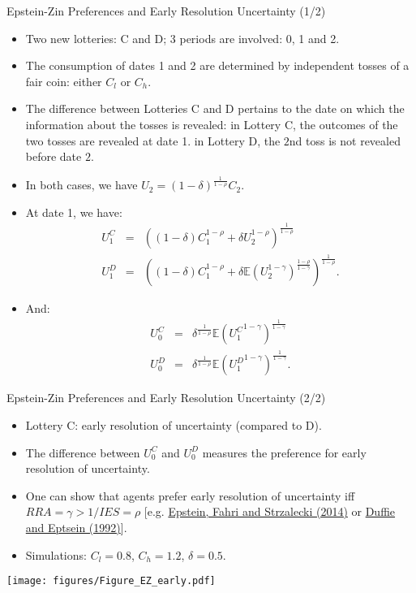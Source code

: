 \begin{frame}{Epstein-Zin Preferences and Early Resolution Uncertainty (1/2)}
\begin{scriptsize}
\begin{itemize}
	\item Two new lotteries: C and D; 3 periods are involved: 0, 1 and 2.
	\item The consumption of dates 1 and 2 are determined by independent tosses of a fair coin: either $C_l$ or $C_h$.
	\item The difference between Lotteries C and D pertains to the date on which the information about the tosses is revealed: in Lottery C, the outcomes of the two tosses are revealed at date 1. in Lottery D, the $2$nd toss is not revealed before date $2$.
	\item In both cases, we have $U_2 = (1-\delta)^{\frac{1}{1-\rho}}C_{2}$.
	\item At date 1, we have:
	\begin{eqnarray*}
	U_1^C &=& \left((1-\delta)C_1^{1-\rho} + \delta U_2^{1-\rho}\right)^{\frac{1}{1-\rho}}\\
	U_1^D &=& \left((1-\delta)C_1^{1-\rho} + \delta \mathbb{E}(U_2^{1-\gamma})^{\frac{1-\rho}{1-\gamma}}\right)^{\frac{1}{1-\rho}}.
	\end{eqnarray*}
	\item And:	
	\begin{eqnarray*}
	U_0^C &=& \delta^{\frac{1}{1-\rho}} \mathbb{E}({U_1^C}^{1-\gamma})^{\frac{1}{1-\gamma}}\\
	U_0^D &=& \delta^{\frac{1}{1-\rho}} \mathbb{E}({U_1^D}^{1-\gamma})^{\frac{1}{1-\gamma}}.
	\end{eqnarray*}
\end{itemize}
\end{scriptsize}
\end{frame}



\begin{frame}{Epstein-Zin Preferences and Early Resolution Uncertainty (2/2)}
\begin{scriptsize}
\begin{itemize}
	\item Lottery C: {\color{blue}early resolution of uncertainty} (compared to D).
	\item The difference between $U_0^C$ and $U_0^D$ measures the preference for early resolution of uncertainty.
	\item One can show that agents prefer early resolution of uncertainty iff $RRA = \gamma > 1/IES = \rho$ [e.g. \href{http://people.bu.edu/lepstein/files-research/premium49d.pdf}{Epstein, Fahri and Strzalecki (2014)} or \href{http://web.stanford.edu/~duffie/jstorlinks/de1.pdf}{Duffie and Eptsein (1992)}].
	\item Simulations: $C_l = 0.8$, $C_h = 1.2$, $\delta = 0.5$.
\end{itemize}
		\texttt{[image: figures/Figure\_EZ\_early.pdf]}
\end{scriptsize}
\end{frame}


